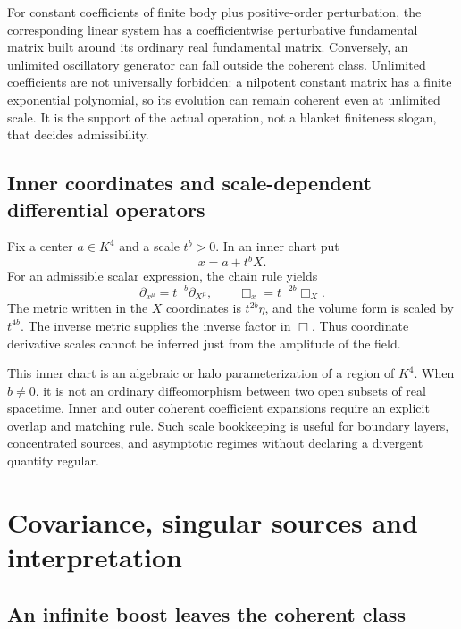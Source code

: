 \documentclass[11pt,letterpaper]{article}
\theoremstyle{definition}
\theoremstyle{remark}
\begin{document}
For constant coefficients of finite body plus positive-order perturbation, the corresponding linear system has a coefficientwise perturbative fundamental matrix built around its ordinary real fundamental matrix. Conversely, an unlimited oscillatory generator can fall outside the coherent class. Unlimited coefficients are not universally forbidden: a nilpotent constant matrix has a finite exponential polynomial, so its evolution can remain coherent even at unlimited scale. It is the support of the actual operation, not a blanket finiteness slogan, that decides admissibility.

\subsection{Inner coordinates and scale-dependent differential operators}\label{vtf:mink:subsec:inner}
Fix a center $a\in K^4$ and a scale $t^b>0$. In an inner chart put
\begin{equation}
 x=a+t^b X.
\end{equation}
For an admissible scalar expression, the chain rule yields
\begin{equation}
 \partial_{x^\mu}=t^{-b}\partial_{X^\mu},
 \qquad \Box_x=t^{-2b}\Box_X.
\end{equation}
The metric written in the $X$ coordinates is $t^{2b}\eta$, and the volume form is scaled by $t^{4b}$. The inverse metric supplies the inverse factor in $\Box$. Thus coordinate derivative scales cannot be inferred just from the amplitude of the field.

This inner chart is an algebraic or halo parameterization of a region of $K^4$. When $b\ne0$, it is not an ordinary diffeomorphism between two open subsets of real spacetime. Inner and outer coherent coefficient expansions require an explicit overlap and matching rule. Such scale bookkeeping is useful for boundary layers, concentrated sources, and asymptotic regimes without declaring a divergent quantity regular.

\section{Covariance, singular sources and interpretation}\label{vtf:mink:sec:limits}

\subsection{An infinite boost leaves the coherent class}\label{vtf:mink:subsec:covariance}
\end{document}
